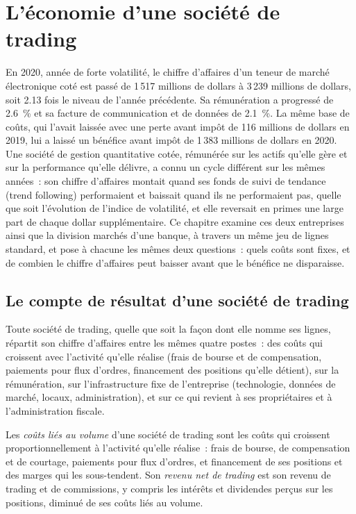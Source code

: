 \chapter{L'économie d'une société de trading}\label{ch:fm:the-economics-of-a-trading-firm}

En 2020, année de forte volatilité, le chiffre d'affaires d'un teneur de marché électronique coté est passé de 1\,517 millions de dollars à 3\,239 millions de dollars, soit 2.13 fois le
niveau de l'année précédente. Sa rémunération a progressé de 2.6~\% et sa facture de communication et de données de 2.1~\%. La même base de coûts, qui l'avait laissée avec une perte avant impôt de 116 millions de dollars
en 2019, lui a laissé un bénéfice avant impôt de 1\,383 millions de dollars en 2020. Une société de gestion quantitative cotée, rémunérée sur les actifs qu'elle gère et sur la
performance qu'elle délivre, a connu un cycle différent sur les mêmes années~: son chiffre d'affaires montait quand ses fonds de suivi de tendance (trend following) performaient et baissait quand ils
ne performaient pas, quelle que soit l'évolution de l'indice de volatilité, et elle reversait en primes une large part de chaque dollar supplémentaire. Ce chapitre examine ces deux entreprises ainsi que la
division marchés d'une banque, à travers un même jeu de lignes standard, et pose à chacune les mêmes deux questions~: quels coûts sont fixes, et de combien
le chiffre d'affaires peut baisser avant que le bénéfice ne disparaisse.

\section{Le compte de résultat d'une société de trading}

Toute société de trading, quelle que soit la façon dont elle nomme ses lignes, répartit son chiffre d'affaires entre les mêmes quatre postes~: des coûts qui croissent avec l'activité qu'elle réalise (frais de bourse
et de compensation, paiements pour flux d'ordres, financement des positions qu'elle détient), sur la rémunération, sur l'infrastructure fixe de l'entreprise (technologie,
données de marché, locaux, administration), et sur ce qui revient à ses propriétaires et à l'administration fiscale.

\begin{definition}\label{def:fm:the-economics-of-a-trading-firm:ntr}
Les \emph{coûts liés au volume} d'une société de trading sont les coûts qui croissent proportionnellement à l'activité qu'elle réalise~: frais de bourse,
de compensation et de courtage, paiements pour flux d'ordres, et financement de ses positions et des marges qui les sous-tendent. Son \emph{revenu net
de trading} est son revenu de trading et de commissions, y compris les intérêts et dividendes perçus sur les positions, diminué de ses
coûts liés au volume.
\end{definition}

